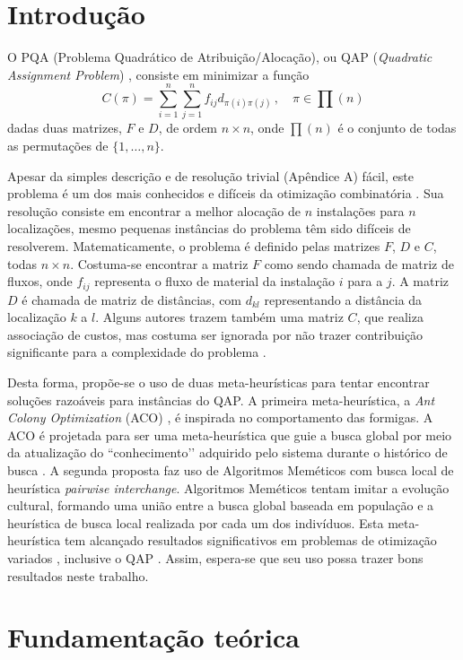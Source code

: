 \section{Introdução}

O PQA (Problema Quadrático de Atribuição/Alocação), ou QAP
(\textit{Quadratic Assignment Problem}) \cite{qap-origin}, consiste em
minimizar a função
 \[ C(\pi) = \sum_{i = 1}^{n} \sum_{j = 1}^{n} f_{ij} d_{\pi(i)
   \pi(j)} \, , \quad \pi \in \prod(n)  \]
dadas duas matrizes, $F$ e $D$, de ordem $n \times n$, onde $\prod(n)$ é o
conjunto de todas as permutações de $\{1, \ldots , n\}$.

Apesar da simples descrição e de resolução trivial (Apêndice A) fácil,
este problema é um dos mais conhecidos e difíceis da otimização
combinatória \cite{Maniezzo98exactand}. Sua resolução consiste em
encontrar a melhor alocação de $n$ instalações para $n$ localizações,
mesmo pequenas instâncias do problema têm sido difíceis de
resolverem. Matematicamente, o problema é definido pelas matrizes $F$,
$D$ e $C$, todas $n \times n$. Costuma-se encontrar a matriz $F$ como
sendo chamada de matriz de fluxos, onde $f_{ij}$ representa o fluxo de
material da instalação $i$ para a $j$. A matriz $D$ é chamada de
matriz de distâncias, com $d_{kl}$ representando a distância da
localização $k$ a $l$. Alguns autores trazem também uma matriz $C$,
que realiza associação de custos, mas costuma ser ignorada por não
trazer contribuição significante para a complexidade do  problema
\cite{QACO}.

Desta forma, propõe-se o uso de duas meta-heurísticas para tentar
encontrar soluções razoáveis para instâncias do QAP. A primeira
meta-heurística, a \textit{Ant Colony Optimization} (ACO) \cite{ACO},
é inspirada no comportamento das formigas. A ACO é projetada para ser
uma meta-heurística que guie a busca global por meio da atualização do
``conhecimento’’ adquirido pelo sistema durante o histórico de busca
\cite{QACO}.
A segunda proposta faz uso de Algoritmos Meméticos \cite{moscato1} com
busca local de heurística \textit{pairwise interchange}. Algoritmos
Meméticos tentam imitar a evolução cultural, formando uma união entre
a busca global baseada em população e a heurística de busca local
realizada por cada um dos indivíduos. Esta meta-heurística tem
alcançado resultados significativos em problemas de otimização
variados \cite{moscato2}, inclusive o QAP
\cite{merz_freisleben}. Assim, espera-se que seu uso possa trazer bons
resultados neste trabalho.


\section{Fundamentação teórica}

